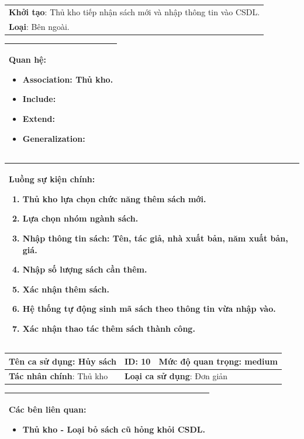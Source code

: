 \documentclass[../report.tex]{subfiles}
\begin{document}
\begin{center}
\begin{tabular}{| m{15.9cm} |}
    \hline
    \textbf{Khởi tạo}: Thủ kho tiếp nhận sách mới và nhập thông tin vào CSDL. \\
    \textbf{Loại}: Bên ngoài.  \\
    \hline
\end{tabular}

\begin{tabular}{| m{15.9cm} |}
    \hline
    \textbf{Quan hệ}:
    \begin{itemize}
        \item Association: Thủ kho. 
        \item Include: 
        \item Extend: 
        \item Generalization: 
    \end{itemize} \\
    \hline
\end{tabular}

\begin{tabular}{| m{15.9cm} |}
    \hline
    \textbf{Luồng sự kiện chính}:
    \begin{enumerate}
        \item Thủ kho lựa chọn chức năng thêm sách mới. 
        \item Lựa chọn nhóm ngành sách. 
        \item Nhập thông tin sách: Tên, tác giả, nhà xuất bản, năm xuất bản, giá. 
        \item Nhập số lượng sách cần thêm. 
        \item Xác nhận thêm sách. 
        \item Hệ thống tự động sinh mã sách theo thông tin vừa nhập vào. 
        \item Xác nhận thao tác thêm sách thành công. 
    \end{enumerate} \\
    \hline
\end{tabular}

\newpage
\begin{tabular}{| m{6cm} | m{3cm} | m{6cm} |}
    \hline
    \textbf{Tên ca sử dụng}: Hủy sách & \textbf{ID}: 10 & \textbf{Mức độ quan trọng}: medium \\
    \hline
    \textbf{Tác nhân chính}: Thủ kho  & \multicolumn{2}{|l|}{\textbf{Loại ca sử dụng}: Đơn giản} \\
    \hline
\end{tabular}
\begin{tabular}{| m{15.9cm} |}
    \hline
        \textbf{Các bên liên quan:} 
        \begin{itemize}
            \item Thủ kho - Loại bỏ sách cũ hỏng khỏi CSDL. 
        \end{itemize} \\
    \hline
\end{tabular}


\end{center}
\end{document}
